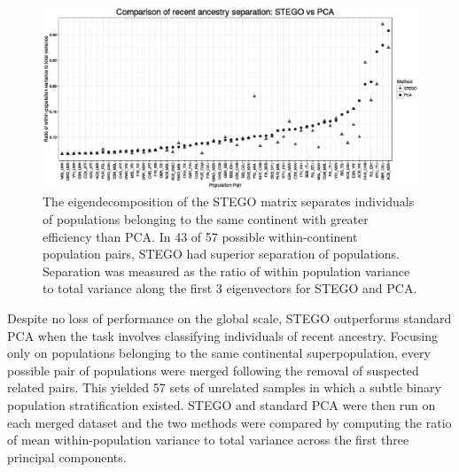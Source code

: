 \begin{figure}
\includegraphics[width=1\columnwidth]{./figures/figure4_bw.eps}
\caption{The eigendecomposition of the STEGO matrix separates individuals of populations belonging to the same continent with greater efficiency than PCA. In 43 of 57 possible within-continent population pairs, STEGO had superior separation of populations. Separation was measured as the ratio of within population variance to total variance along the first 3 eigenvectors for STEGO and PCA. }
\label{fig: pairwise_variances}
\end{figure}

Despite no loss of performance on the global scale, STEGO outperforms standard PCA when the task involves classifying
individuals of recent ancestry. Focusing only on populations belonging
to the same continental superpopulation, every possible pair of populations were
merged following the removal of suspected related pairs. This yielded 57 sets of unrelated samples in which a subtle binary population stratification existed. STEGO and
standard PCA were then run on each merged dataset and the two methods
were compared by computing the ratio of mean within-population variance
to total variance across the first three principal components. 

